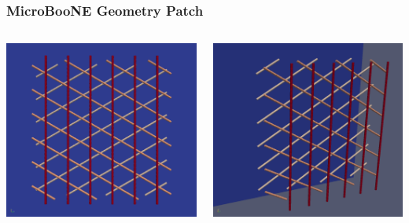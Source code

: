 \documentclass[xcolor=dvipsnames]{beamer}
\begin{document}
\begin{frame}
\end{frame}



\begin{frame}
  \frametitle{MicroBooNE Geometry Patch}

  \begin{columns}
    \begin{column}{0.5\textwidth}
      \begin{center}
        \includegraphics[width=\textwidth]{wires-flat.png}
      \end{center}
    \end{column}
    \begin{column}{0.5\textwidth}
      \begin{center}
        \includegraphics[width=\textwidth]{wires-iso.png}
      \end{center}
    \end{column}
  \end{columns}
  


\end{frame}
\end{document}
